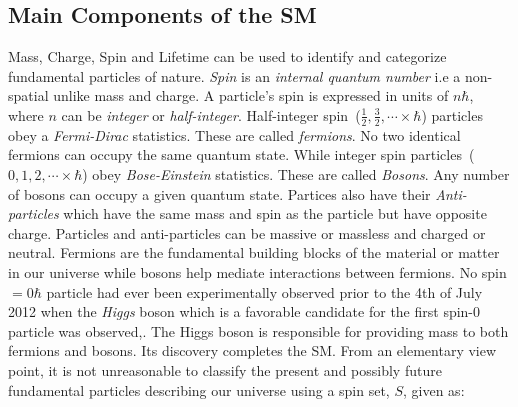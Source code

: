\subsection{Main Components of the SM}
Mass, Charge, Spin and Lifetime can be used to identify and categorize fundamental particles of nature. \textit{Spin} is an \textit{internal quantum number} i.e a non-spatial unlike mass and charge. A particle's spin is expressed in units of $n\hbar$, where $n$ can be \textit{integer} or \textit{half-integer}.
Half-integer spin~($\frac{1}{2},\frac{3}{2},\cdots \times\hbar$) particles obey a \textit{Fermi-Dirac} statistics. These are called \textit{fermions}. No two identical fermions can occupy the same quantum state. While integer spin particles~($0,1,2,\cdots\times \hbar$) obey \textit{Bose-Einstein} statistics. These are called \textit{Bosons}. Any number of bosons can occupy a given quantum state.
Partices also have their \textit{Anti-particles} which have the same mass and spin as the particle but have opposite charge. Particles and anti-particles can be massive or massless and charged or neutral. 
Fermions are the fundamental building blocks of the material or matter in our universe while bosons help mediate interactions between fermions. No spin $=0\hbar$ particle had ever been experimentally observed prior to the 4th of July 2012 when the \textit{Higgs} boson which is a favorable candidate for the first spin-$0$ particle was observed,\cite{HIGGSD}. The Higgs boson is responsible for providing mass to both fermions and bosons. Its discovery completes the SM. From an elementary view point, it is not unreasonable to classify the present and possibly future fundamental particles describing our universe using a spin set, $S$, given as:

